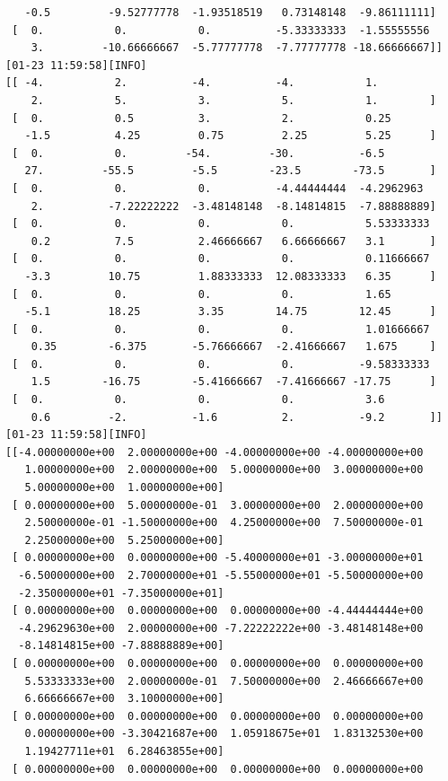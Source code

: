 \documentclass[
  letterpaper,
  DIV=11,
  numbers=noendperiod]{scrartcl}
\begin{document}
\begin{verbatim}
   -0.5         -9.52777778  -1.93518519   0.73148148  -9.86111111]
 [  0.           0.           0.          -5.33333333  -1.55555556
    3.         -10.66666667  -5.77777778  -7.77777778 -18.66666667]]
[01-23 11:59:58][INFO] 
[[ -4.           2.          -4.          -4.           1.
    2.           5.           3.           5.           1.        ]
 [  0.           0.5          3.           2.           0.25
   -1.5          4.25         0.75         2.25         5.25      ]
 [  0.           0.         -54.         -30.          -6.5
   27.         -55.5         -5.5        -23.5        -73.5       ]
 [  0.           0.           0.          -4.44444444  -4.2962963
    2.          -7.22222222  -3.48148148  -8.14814815  -7.88888889]
 [  0.           0.           0.           0.           5.53333333
    0.2          7.5          2.46666667   6.66666667   3.1       ]
 [  0.           0.           0.           0.           0.11666667
   -3.3         10.75         1.88333333  12.08333333   6.35      ]
 [  0.           0.           0.           0.           1.65
   -5.1         18.25         3.35        14.75        12.45      ]
 [  0.           0.           0.           0.           1.01666667
    0.35        -6.375       -5.76666667  -2.41666667   1.675     ]
 [  0.           0.           0.           0.          -9.58333333
    1.5        -16.75        -5.41666667  -7.41666667 -17.75      ]
 [  0.           0.           0.           0.           3.6
    0.6         -2.          -1.6          2.          -9.2       ]]
[01-23 11:59:58][INFO] 
[[-4.00000000e+00  2.00000000e+00 -4.00000000e+00 -4.00000000e+00
   1.00000000e+00  2.00000000e+00  5.00000000e+00  3.00000000e+00
   5.00000000e+00  1.00000000e+00]
 [ 0.00000000e+00  5.00000000e-01  3.00000000e+00  2.00000000e+00
   2.50000000e-01 -1.50000000e+00  4.25000000e+00  7.50000000e-01
   2.25000000e+00  5.25000000e+00]
 [ 0.00000000e+00  0.00000000e+00 -5.40000000e+01 -3.00000000e+01
  -6.50000000e+00  2.70000000e+01 -5.55000000e+01 -5.50000000e+00
  -2.35000000e+01 -7.35000000e+01]
 [ 0.00000000e+00  0.00000000e+00  0.00000000e+00 -4.44444444e+00
  -4.29629630e+00  2.00000000e+00 -7.22222222e+00 -3.48148148e+00
  -8.14814815e+00 -7.88888889e+00]
 [ 0.00000000e+00  0.00000000e+00  0.00000000e+00  0.00000000e+00
   5.53333333e+00  2.00000000e-01  7.50000000e+00  2.46666667e+00
   6.66666667e+00  3.10000000e+00]
 [ 0.00000000e+00  0.00000000e+00  0.00000000e+00  0.00000000e+00
   0.00000000e+00 -3.30421687e+00  1.05918675e+01  1.83132530e+00
   1.19427711e+01  6.28463855e+00]
 [ 0.00000000e+00  0.00000000e+00  0.00000000e+00  0.00000000e+00

\end{verbatim}
\end{document}
